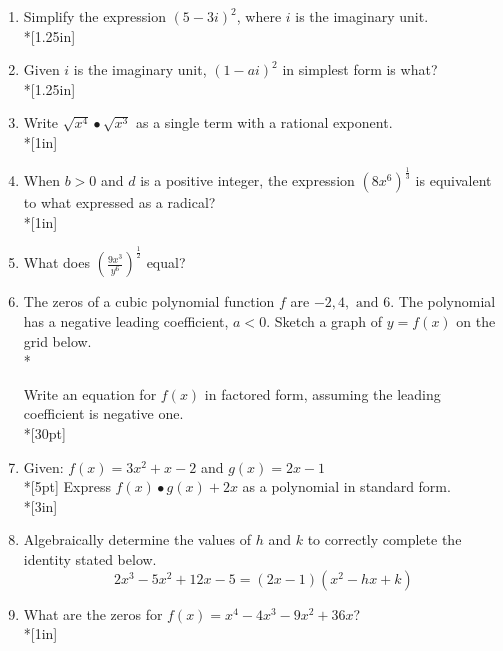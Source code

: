 \documentclass[12pt, oneside]{article}
\begin{document}
\begin{enumerate}
\newpage

\item Simplify the expression $(5 - 3i)^2$, where $i$ is the imaginary unit. \\*[1.25in]

\item Given $i$ is the imaginary unit, $(1-ai)^2$ in simplest form is what?  \\*[1.25in]%


\item Write $\sqrt{x^4} \bullet \sqrt{x^3}$ as a single term with a rational exponent.\\*[1in]

\item When $b>0$ and $d$ is a positive integer, the expression $\displaystyle \left(8x^6 \right)^\frac{1}{3}$ is equivalent to what expressed as a radical? \\*[1in]%

\item What does $\displaystyle \left( \frac{9x^3}{y^6} \right)^\frac{1}{2}$ equal?

\newpage
\item The zeros of a cubic polynomial function $f$ are  $-2, 4, \text{ and } 6$. The polynomial has a negative leading coefficient, $a<0$. Sketch a graph of $y = f(x)$ on the grid below.\\*
\begin{center}
\end{center}
Write an equation for $f(x)$ in factored form, assuming the leading coefficient is negative one.\\*[30pt]


\newpage
\item Given: $f(x)=3x^2+ x - 2$ and $g(x)=2x-1$\\*[5pt]
Express $f(x) \bullet g(x) + 2x$ as a polynomial in standard form. \\*[3in]


\item Algebraically determine the values of $h$ and $k$ to correctly complete the identity stated below.
\[2x^3-5x^2+12x-5=(2x-1)(x^2-hx+k)\] %


\newpage
\item What are the zeros for $f(x)=x^4-4x^3-9x^2+36x$? \\*[1in]  %


\end{enumerate}
\end{document}
